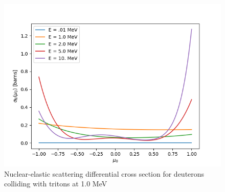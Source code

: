 \begin{figure}[!htb]
    \centering
    \includegraphics[scale=0.75]{../figures/proposed_work/sig_n_dt.png}
    \caption{Nuclear-elastic scattering differential cross section for deuterons colliding with tritons at 1.0 MeV}
    \label{fig:sig_n}
\end{figure}